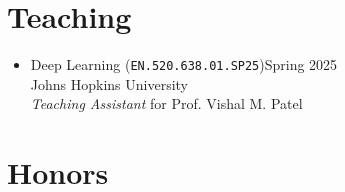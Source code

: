 \documentclass[10pt,margin,line,pifont,palatino,courier]{res}
\begin{document}
\begin{resume}
\section{\sc Teaching}

\begin{itemize}[leftmargin=*]
    \item Deep Learning (\verb|EN.520.638.01.SP25|)\hfill Spring 2025\\
        Johns Hopkins University\\
        \textit{Teaching Assistant} for Prof. Vishal M. Patel
\end{itemize}

%
%
%

\section{\sc Honors}


\end{resume}
\end{document}
